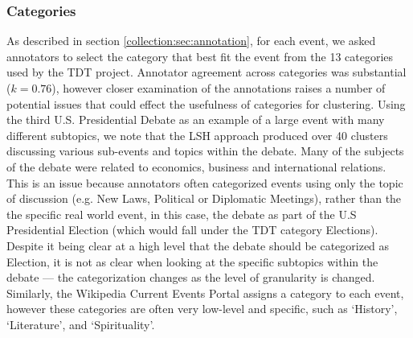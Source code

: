 \subsubsection{Categories}
As described in section \ref{collection:sec:annotation}, for each event, we asked annotators to select the category that best fit the event from the 13 categories used by the TDT project.
Annotator agreement across categories was substantial (\(k = 0.76\)), however closer examination of the annotations raises a number of potential issues that could effect the usefulness of categories for clustering.
Using the third U.S. Presidential Debate as an example of a large event with many different subtopics, we note that the LSH approach produced over 40 clusters discussing various sub-events and topics within the debate.
Many of the subjects of the debate were related to economics, business and international relations.
This is an issue because annotators often categorized events using only the topic of discussion (e.g. New Laws, Political or Diplomatic Meetings), rather than the the specific real world event, in this case, the debate as part of the U.S Presidential Election (which would fall under the TDT category Elections).
Despite it being clear at a high level that the debate should be categorized as Election, it is not as clear when looking at the specific subtopics within the debate --- the categorization changes as the level of granularity is changed.
Similarly, the Wikipedia Current Events Portal assigns a category to each event, however these categories are often very low-level and specific, such as `History', `Literature', and `Spirituality'.

